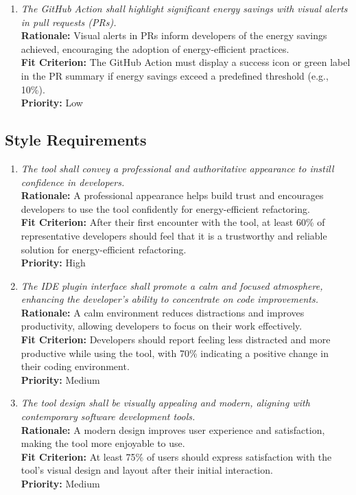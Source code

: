 \documentclass[12pt]{article}
\begin{document}
\begin{enumerate}[label=LFR-AP \arabic*., wide=0pt, leftmargin=*]
    {\bf Fit Criterion:} The tool should prominently display only the code, refactoring suggestions, and energy metrics, omitting unnecessary visual elements or distractions.\\
    {\bf Priority:} Low
    \item \emph{The GitHub Action shall highlight significant energy savings with visual alerts in pull requests (PRs).}\\[2mm]
    {\bf Rationale:} Visual alerts in PRs inform developers of the energy savings achieved, encouraging the adoption of energy-efficient practices.\\
    {\bf Fit Criterion:} The GitHub Action must display a success icon or green label in the PR summary if energy savings exceed a predefined threshold (e.g., 10\%).\\
    {\bf Priority:} Low
\end{enumerate}
\subsection{Style Requirements}
\begin{enumerate}[label=LFR-ST \arabic*., wide=0pt, leftmargin=*]
    \item \emph{The tool shall convey a professional and authoritative appearance to instill confidence in developers.}\\[2mm]
    {\bf Rationale:} A professional appearance helps build trust and encourages developers to use the tool confidently for energy-efficient refactoring.\\
    {\bf Fit Criterion:} After their first encounter with the tool, at least 60\% of representative developers should feel that it is a trustworthy and reliable solution for energy-efficient refactoring.\\
    {\bf Priority:} High
    \item \emph{The IDE plugin interface shall promote a calm and focused atmosphere, enhancing the developer's ability to concentrate on code improvements.}\\[2mm]
    {\bf Rationale:} A calm environment reduces distractions and improves productivity, allowing developers to focus on their work effectively.\\
    {\bf Fit Criterion:} Developers should report feeling less distracted and more productive while using the tool, with 70\% indicating a positive change in their coding environment.\\
    {\bf Priority:} Medium
    \item \emph{The tool design shall be visually appealing and modern, aligning with contemporary software development tools.}\\[2mm]
    {\bf Rationale:} A modern design improves user experience and satisfaction, making the tool more enjoyable to use.\\
    {\bf Fit Criterion:} At least 75\% of users should express satisfaction with the tool's visual design and layout after their initial interaction.\\
    {\bf Priority:} Medium
\end{enumerate}
\end{document}
